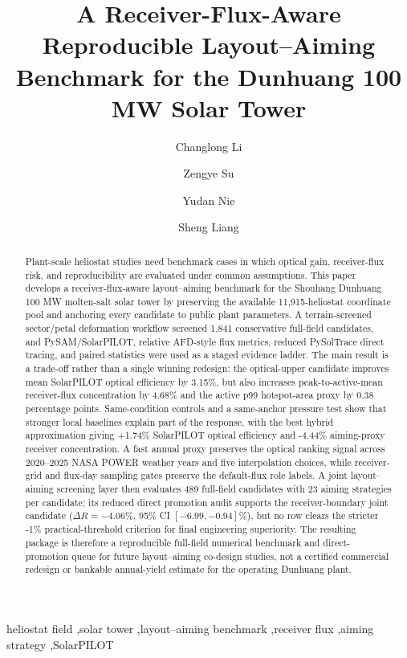 \documentclass[final,3p,times]{elsarticle}
\begin{document}
\begin{frontmatter}

\title{A Receiver-Flux-Aware Reproducible Layout--Aiming Benchmark for the Dunhuang 100 MW Solar Tower}

\author[aff1]{Changlong Li}
\author[aff1]{Zengye Su}
\author[aff1]{Yudan Nie}
\author[aff1]{Sheng Liang}
\address[aff1]{Guangzhou College of Commerce, Guangzhou, China}

\begin{abstract}
Plant-scale heliostat studies need benchmark cases in which optical gain, receiver-flux risk, and reproducibility are evaluated under common assumptions. This paper develops a receiver-flux-aware layout--aiming benchmark for the Shouhang Dunhuang 100 MW molten-salt solar tower by preserving the available 11,915-heliostat coordinate pool and anchoring every candidate to public plant parameters. A terrain-screened sector/petal deformation workflow screened 1,841 conservative full-field candidates, and PySAM/SolarPILOT, relative AFD-style flux metrics, reduced PySolTrace direct tracing, and paired statistics were used as a staged evidence ladder. The main result is a trade-off rather than a single winning redesign: the optical-upper candidate improves mean SolarPILOT optical efficiency by 3.15\%, but also increases peak-to-active-mean receiver-flux concentration by 4.68\% and the active p99 hotspot-area proxy by 0.38 percentage points. Same-condition controls and a same-anchor pressure test show that stronger local baselines explain part of the response, with the best hybrid approximation giving +1.74\% SolarPILOT optical efficiency and -4.44\% aiming-proxy receiver concentration. A fast annual proxy preserves the optical ranking signal across 2020--2025 NASA POWER weather years and five interpolation choices, while receiver-grid and flux-day sampling gates preserve the default-flux role labels. A joint layout--aiming screening layer then evaluates 489 full-field candidates with 23 aiming strategies per candidate; its reduced direct promotion audit supports the receiver-boundary joint candidate ($\Delta R=-4.06\%$, 95\% CI $[-6.99,-0.94]\%$), but no row clears the stricter -1\% practical-threshold criterion for final engineering superiority. The resulting package is therefore a reproducible full-field numerical benchmark and direct-promotion queue for future layout--aiming co-design studies, not a certified commercial redesign or bankable annual-yield estimate for the operating Dunhuang plant.
\end{abstract}

\begin{keyword}
heliostat field \sep solar tower \sep layout--aiming benchmark \sep receiver flux \sep aiming strategy \sep SolarPILOT
\end{keyword}

\end{frontmatter}
\end{document}
